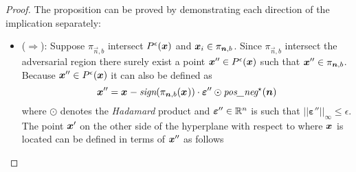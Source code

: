 \begin{proof}
The proposition can be proved by demonstrating each direction of the implication separately:
\begin{itemize}

\item ($\Longrightarrow$): Suppose $\pi_{\vec{n}, b}$ intersect $\pert$ and $\x \in \pi_{\vec{n}, b}$. Since $\pi_{\vec{n}, b}$ intersect the adversarial region there surely exist a point $\x[]'' \in \pert$ such that $\x[]'' \in \pi_{\vec{n}, b}$. Because $\x[]'' \in \pert$ it can also be defined as
\[
  \x[]'' = \x[] - \sign(\pi_{\vec{n}, b}(\x[]))\cdot \bm{\varepsilon}'' \odot \textit{pos\_neg}^\star(\vec{n})
\]
where $\odot$ denotes the \textit{Hadamard} product and $\bm{\varepsilon}'' \in \R$ is such that $||\bm{\varepsilon}''||_\infty \le \epsilon$. The point $\x[]'$ on the other side of the hyperplane with respect to where $\x[]$ is located can be defined in terms of $\x[]''$ as follows


\end{itemize}
\end{proof}
